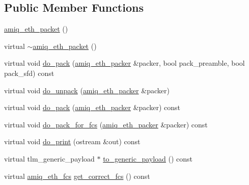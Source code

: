 \subsection*{Public Member Functions}
\begin{DoxyCompactItemize}
\item 
\hyperlink{classamiq__eth__packet_a43b53f467fec192349879a89c51fe33c}{amiq\_\-eth\_\-packet} ()
\item 
virtual \hyperlink{classamiq__eth__packet_a2734b85141844331fded960c4c91f8b7}{$\sim$amiq\_\-eth\_\-packet} ()
\item 
virtual void \hyperlink{classamiq__eth__packet_a37c0f0b45e9648a710310c7c3acca77f}{do\_\-pack} (\hyperlink{classamiq__eth__packer}{amiq\_\-eth\_\-packer} \&packer, bool pack\_\-preamble, bool pack\_\-sfd) const 
\item 
virtual void \hyperlink{classamiq__eth__packet_a909eb3860185125564fa530496ed1c9e}{do\_\-unpack} (\hyperlink{classamiq__eth__packer}{amiq\_\-eth\_\-packer} \&packer)
\item 
virtual void \hyperlink{classamiq__eth__packet_ab580d89fb44208f5a0fe31443619473e}{do\_\-pack} (\hyperlink{classamiq__eth__packer}{amiq\_\-eth\_\-packer} \&packer) const 
\item 
virtual void \hyperlink{classamiq__eth__packet_aacbc675df31e2674b5b4c73c9bd9961e}{do\_\-pack\_\-for\_\-fcs} (\hyperlink{classamiq__eth__packer}{amiq\_\-eth\_\-packer} \&packer) const 
\item 
virtual void \hyperlink{classamiq__eth__packet_aa179c700ae183f1b884a9222a73fed4e}{do\_\-print} (ostream \&out) const 
\item 
virtual tlm\_\-generic\_\-payload $\ast$ \hyperlink{classamiq__eth__packet_a6dd92751d8172eeaa347d71bb415b0d5}{to\_\-generic\_\-payload} () const 
\item 
virtual \hyperlink{amiq__eth__types_8cpp_adb511dc715b55539c6abdad1de981a9f}{amiq\_\-eth\_\-fcs} \hyperlink{classamiq__eth__packet_a2f1fcef6ebdffa00a9b34fc7eae1be5e}{get\_\-correct\_\-fcs} () const 
\end{DoxyCompactItemize}
